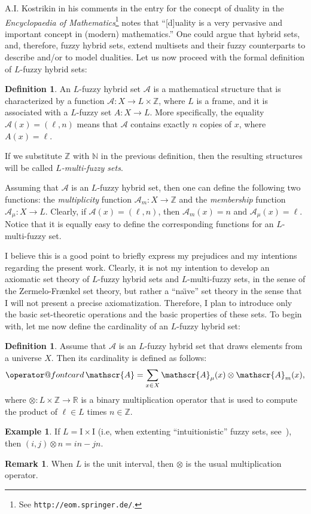 \documentclass{amsart}
\makeatletter
\theoremstyle{definition}
\newtheorem{definition}[theorem]{Definition}
\newtheorem{example}[theorem]{Example}
\newtheorem{remark}[theorem]{Remark}
\newcommand{\card}{\mathop{\operator@font card}}
\makeatother
\begin{document}
A.I. Kostrikin in his comments in the entry for the conecpt of duality in the
{\em Encyclopaedia of Mathematics}\footnote{See \texttt{http://eom.springer.de/}.} notes
that ``[d]uality is a very pervasive and important concept in (modern) mathematics.''
One could argue that hybrid sets, and, therefore, fuzzy hybrid sets, extend multisets and
their fuzzy counterparts to describe and/or to model dualities. Let us now proceed with the 
formal definition of $L$-fuzzy hybrid sets:
\begin{definition}\label{fuzzy:hybrid:set}
An $L$-fuzzy hybrid set $\mathscr{A}$ is a mathematical structure that is
characterized by a function $\mathscr{A}:X\rightarrow L\times\mathbb{Z}$, 
where $L$ is a frame, and it is associated with a $L$-fuzzy set 
$A:X\rightarrow L$. More specifically, the equality $\mathscr{A}(x)=(\ell,n)$ 
means that $\mathscr{A}$ contains exactly $n$ copies of $x$, where
$A(x)=\ell$.  
\end{definition}
If we substitute $\mathbb{Z}$ with $\mathbb{N}$ in the previous 
definition, then the resulting structures will be called {\em $L$-multi-fuzzy sets}.   

Assuming that $\mathscr{A}$ is an $L$-fuzzy hybrid set, then one can define 
the following two functions: the \textit{multiplicity} function 
$\mathscr{A}_{m}:X\rightarrow\mathbb{Z}$ and the \textit{membership} 
function $\mathscr{A}_{\mu}:X\rightarrow L$. Clearly, if 
$\mathscr{A}(x)=(\ell,n)$, then  $\mathscr{A}_{m}(x)=n$ 
and $\mathscr{A}_{\mu}(x)=\ell$.
Notice that it is equally easy to define the corresponding functions for an
$L$-multi-fuzzy set.

I believe this is a good point to briefly express my prejudices and my 
intentions regarding the present work. Clearly, it is not my intention to 
develop an axiomatic set theory of $L$-fuzzy hybrid sets and $L$-multi-fuzzy 
sets, in the sense of the Zermelo-Fr{\ae}nkel set theory, but rather a 
``na{\"\i}ve'' set theory in the sense that I will not present a precise 
axiomatization. Therefore, I plan to introduce only the basic set-theoretic 
operations and the basic properties of these sets. To begin with,
let me now define the cardinality of an $L$-fuzzy hybrid set: 
\begin{definition}
Assume that $\mathscr{A}$ is an $L$-fuzzy hybrid set that draws elements 
from a universe $X$. Then its cardinality is defined as follows:
\begin{displaymath}
\card\mathscr{A} = \sum_{x\in X}\mathscr{A}_{\mu}(x)\otimes\mathscr{A}_{m}(x),
\end{displaymath}
where $\otimes:L\times\mathbb{Z}\rightarrow\mathbb{R}$ is a binary multiplication operator 
that is used to compute the product of $\ell\in L$ times $n\in\mathbb{Z}$.
\end{definition}
\begin{example}
If $L=\mathrm{I}\times\mathrm{I}$ (i.e, when extenting ``intuitionistic'' fuzzy sets, 
see~\cite{syropoulos2010}), 
then $(i,j)\otimes n=in-jn$.
\end{example}
\begin{remark}
When $L$ is the unit interval, then $\otimes$ is the usual multiplication operator.
\end{remark}
\end{document}
